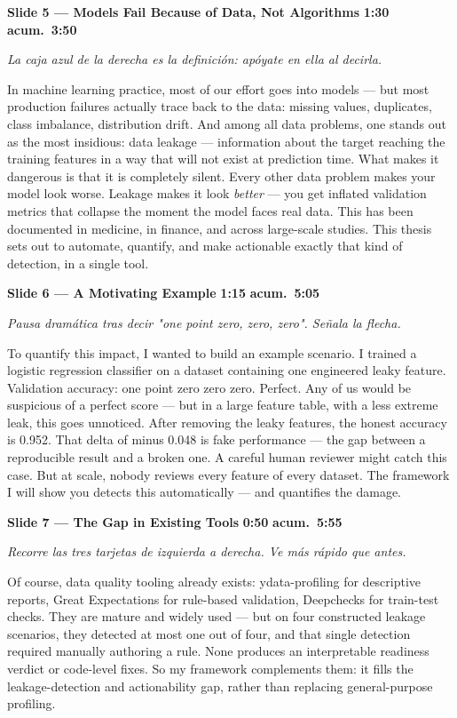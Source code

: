 \documentclass[11pt,a4paper]{article}
\newcommand{\slide}[6]{%
\begin{mdframed}[backgroundcolor=paleBlue, linecolor=upmBlue, linewidth=1pt,
                 roundcorner=4pt, skipabove=10pt, skipbelow=2pt,
                 innertopmargin=6pt, innerbottommargin=6pt]
\textbf{\color{upmBlue}Slide #1 --- #2}\hfill
\colorbox{upmOrange}{\color{white}\small\textbf{ #3 }}\;%
\colorbox{upmBlue}{\color{white}\small\textbf{ acum.\ #4 }}
\end{mdframed}
{\small\itshape\color{grayTxt}#5}\par\vspace{2pt}
#6\par\vspace{6pt}}
\begin{document}
\slide{5}{Models Fail Because of Data, Not Algorithms}{1:30}{3:50}
{La caja azul de la derecha es la definición: apóyate en ella al decirla.}
{In machine learning practice, most of our effort goes into models --- but
most production failures actually trace back to the data: missing values,
duplicates, class imbalance, distribution drift. And among all data problems,
one stands out as the most insidious: data leakage --- information about the
target reaching the training features in a way that will not exist at
prediction time. What makes it
dangerous is that it is completely silent. Every other data problem makes your
model look worse. Leakage makes it look \emph{better} --- you get inflated
validation metrics that collapse the moment the model faces real data. This
has been documented in medicine, in finance, and across large-scale studies.
This thesis sets out to automate, quantify, and make actionable exactly that
kind of detection, in a single tool.}

\slide{6}{A Motivating Example}{1:15}{5:05}
{Pausa dramática tras decir "one point zero, zero, zero". Señala la flecha.}
{To quantify this impact, I wanted to build an example scenario. I trained a
logistic regression classifier on a dataset containing one engineered leaky
feature. Validation accuracy: one
point zero zero zero. Perfect. Any of us would be suspicious of a perfect
score --- but in a large feature table, with a less extreme leak, this goes
unnoticed. After removing the leaky features, the honest accuracy is 0.952.
That delta of minus 0.048 is fake performance --- the gap between a
reproducible result and a broken one. A careful human reviewer might catch
this case. But at scale, nobody reviews every feature of every dataset. The
framework I will show you detects this automatically --- and quantifies the
damage.}

\slide{7}{The Gap in Existing Tools}{0:50}{5:55}
{Recorre las tres tarjetas de izquierda a derecha. Ve más rápido que antes.}
{Of course, data quality tooling already exists: ydata-profiling for
descriptive reports, Great Expectations for rule-based validation, Deepchecks
for train-test checks. They are mature and widely used --- but on four
constructed leakage scenarios, they detected at most one out of four, and that
single detection required manually authoring a rule. None produces an
interpretable readiness verdict or code-level fixes. So my framework
complements them: it fills the leakage-detection and actionability gap,
rather than replacing general-purpose profiling.}
\end{document}
